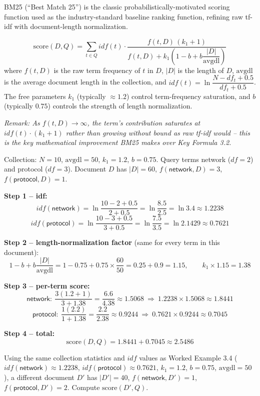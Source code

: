 \documentclass[11pt, a4paper]{article}
\newcommand{\Note}[1]{\par\noindent\textit{\color{darkgray}Remark: #1}\par}
\begin{document}
BM25 (``Best Match 25'') is the classic probabilistically-motivated scoring function used as the industry-standard baseline ranking function, refining raw tf-idf with document-length normalization.

\begin{formulabox}
\[
\text{score}(D,Q) = \sum_{t \in Q} idf(t)\cdot \frac{f(t,D)\,(k_1+1)}{f(t,D) + k_1\left(1-b+b\dfrac{|D|}{\text{avgdl}}\right)}
\]
where $f(t,D)$ is the raw term frequency of $t$ in $D$, $|D|$ is the length of $D$, $\text{avgdl}$ is the average document length in the collection, and $idf(t) = \ln\!\dfrac{N-df_t+0.5}{df_t+0.5}$. The free parameters $k_1$ (typically $\approx1.2$) control term-frequency saturation, and $b$ (typically $0.75$) controls the strength of length normalization.
\end{formulabox}

\Note{As $f(t,D)\to\infty$, the term's contribution saturates at $idf(t)\cdot(k_1+1)$ rather than growing without bound as raw tf-idf would -- this is the key mathematical improvement BM25 makes over Key Formula 3.2.}

\begin{examplebox}
Collection: $N=10$, $\text{avgdl}=50$, $k_1=1.2$, $b=0.75$. Query terms \textsf{network} ($df=2$) and \textsf{protocol} ($df=3$). Document $D$ has $|D|=60$, $f(\textsf{network},D)=3$, $f(\textsf{protocol},D)=1$.

\textbf{Step 1 -- idf:}
\[
idf(\textsf{network}) = \ln\frac{10-2+0.5}{2+0.5} = \ln\frac{8.5}{2.5}=\ln 3.4 \approx 1.2238
\]
\[
idf(\textsf{protocol}) = \ln\frac{10-3+0.5}{3+0.5} = \ln\frac{7.5}{3.5}=\ln 2.1429 \approx 0.7621
\]

\textbf{Step 2 -- length-normalization factor} (same for every term in this document):
\[
1-b+b\frac{|D|}{\text{avgdl}} = 1-0.75+0.75\times\frac{60}{50} = 0.25+0.9=1.15, \qquad k_1\times1.15 = 1.38
\]

\textbf{Step 3 -- per-term score:}
\[
\textsf{network}: \ \frac{3(1.2+1)}{3+1.38}=\frac{6.6}{4.38}\approx1.5068 \ \Rightarrow\ 1.2238\times1.5068\approx1.8441
\]
\[
\textsf{protocol}: \ \frac{1(2.2)}{1+1.38}=\frac{2.2}{2.38}\approx0.9244 \ \Rightarrow\ 0.7621\times0.9244\approx0.7045
\]

\textbf{Step 4 -- total:}
\[
\text{score}(D,Q) = 1.8441+0.7045 \approx 2.5486
\]
\end{examplebox}

\begin{exercisebox}
Using the same collection statistics and $idf$ values as Worked Example 3.4 ($idf(\textsf{network})\approx1.2238$, $idf(\textsf{protocol})\approx0.7621$, $k_1=1.2$, $b=0.75$, $\text{avgdl}=50$), a different document $D'$ has $|D'|=40$, $f(\textsf{network},D')=1$, $f(\textsf{protocol},D')=2$. Compute $\text{score}(D',Q)$.
\end{exercisebox}
\end{document}
